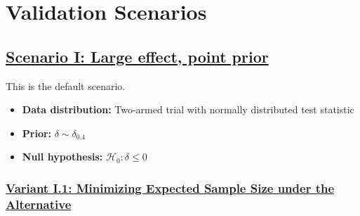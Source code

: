 \documentclass[]{book}
\providecommand{\tightlist}{%
  \setlength{\itemsep}{0pt}\setlength{\parskip}{0pt}}
\begin{document}
\hypertarget{validation-scenarios}{%
\section{Validation Scenarios}\label{validation-scenarios}}

\hypertarget{scenario-i-large-effect-point-prior}{%
\subsection{\texorpdfstring{\protect\hyperlink{scenarioI}{Scenario I: Large effect, point prior}}{Scenario I: Large effect, point prior}}\label{scenario-i-large-effect-point-prior}}

This is the default scenario.

\begin{itemize}
\tightlist
\item
  \textbf{Data distribution:} Two-armed trial with normally distributed test statistic
\item
  \textbf{Prior:} \(\delta\sim\delta_{0.4}\)
\item
  \textbf{Null hypothesis:} \(\mathcal{H}_0:\delta \leq 0\)
\end{itemize}

\hypertarget{variant-i.1-minimizing-expected-sample-size-under-the-alternative}{%
\subsubsection{\texorpdfstring{\protect\hyperlink{variantI_1}{Variant I.1: Minimizing Expected Sample Size under the Alternative}}{Variant I.1: Minimizing Expected Sample Size under the Alternative}}\label{variant-i.1-minimizing-expected-sample-size-under-the-alternative}}
\end{document}
